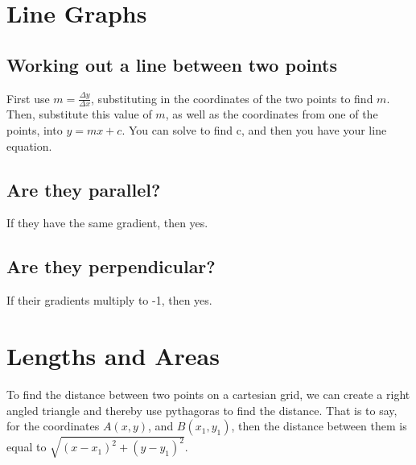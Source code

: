 \section{Line Graphs}
\subsection{Working out a line between two points}
First use $m=\frac{\Delta y}{\Delta x}$, substituting in the coordinates of the two points to find $m$. Then, substitute this value of $m$, as well as the coordinates from one of the points, into $y=mx+c$. You can solve to find c, and then you have your line equation.
\subsection{Are they parallel?}
If they have the same gradient, then yes.
\subsection{Are they perpendicular?}
If their gradients multiply to -1, then yes.

\section{Lengths and Areas}
To find the distance between two points on a cartesian grid, we can create a right angled triangle and thereby use pythagoras to find the distance. That is to say, for the coordinates $A (x, y)$, and $B (x_1, y_1)$, then the distance between them is equal to $\sqrt{(x-x_1)^2+(y-y_1)^2}$.

